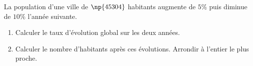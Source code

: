 \begin{exo}{}
	La population d'une ville de $\np{45304}$ habitants augmente de $5\%$ puis diminue de $10\%$ l'année suivante.
	\begin{enumerate}
		\item Calculer le taux d'évolution global sur les deux années.
		\item Calculer le nombre d'habitants après ces évolutions. Arrondir à l'entier le plus proche.
	\end{enumerate}
\end{exo}

